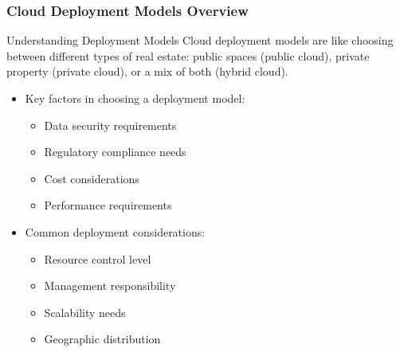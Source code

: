 \documentclass{beamer}
\begin{document}
\begin{frame}
    \frametitle{Cloud Deployment Models Overview}
    
    \begin{alertblock}{Understanding Deployment Models}
        Cloud deployment models are like choosing between different types of real estate: public spaces (public cloud), private property (private cloud), or a mix of both (hybrid cloud).
    \end{alertblock}
    
    \begin{itemize}
        \item Key factors in choosing a deployment model:
        \begin{itemize}
            \item Data security requirements
            \item Regulatory compliance needs
            \item Cost considerations
            \item Performance requirements
        \end{itemize}
        
        \item Common deployment considerations:
        \begin{itemize}
            \item Resource control level
            \item Management responsibility
            \item Scalability needs
            \item Geographic distribution
        \end{itemize}
    \end{itemize}
\end{frame}
\end{document}

